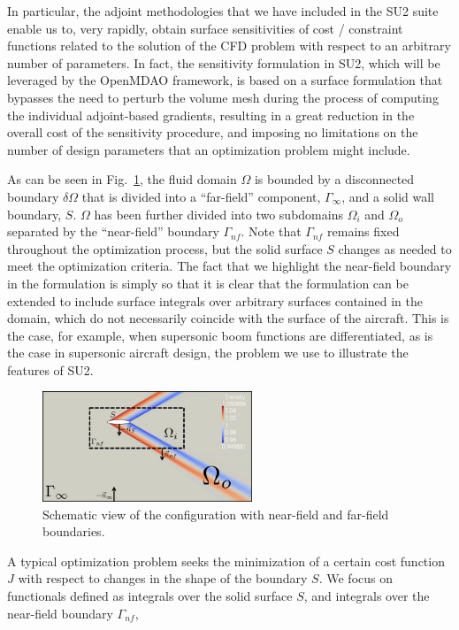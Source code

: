 \documentclass[]{aiaa-tc}
\begin{document}
In particular, the adjoint methodologies that we have included in the SU2 suite enable us to, very rapidly, obtain surface sensitivities of cost / constraint functions related to the solution of the CFD problem with respect to an arbitrary number of parameters.  In fact, the sensitivity formulation in SU2, which will be leveraged by the OpenMDAO framework, is based on a surface formulation that bypasses the need to perturb the volume mesh during the process of computing the individual adjoint-based gradients, resulting in a great reduction in the overall cost of the sensitivity procedure, and imposing no limitations on the number of design parameters that an optimization problem might include.

%
As can be seen in Fig.~\ref{fig:sketch}, the fluid domain $\Omega$ is bounded by a disconnected boundary $\delta \Omega$ that is divided into a ``far-field'' component, $\Gamma_\infty$, and a solid wall boundary, $S$. $\Omega$ has been further divided into two subdomains $\Omega_i$ and $\Omega_o$ separated by the ``near-field'' boundary $\Gamma_{nf}$. Note that $\Gamma_{nf}$ remains fixed throughout the optimization process, but the solid surface $S$ changes as needed to meet the optimization criteria.  The fact that we highlight the near-field boundary in the formulation is simply so that it is clear that the formulation can be extended to include surface integrals over arbitrary surfaces contained in the domain, which do not necessarily coincide with the surface of the aircraft.  This is the case, for example, when supersonic boom functions are differentiated, as is the case in supersonic aircraft design, the problem we use to illustrate the features of SU2.
%
\begin{figure}
  \begin{center}
	\includegraphics[bb = 0 0 720 378,width=0.56\textwidth]{images/sketch.jpg}
	\caption{Schematic view of the configuration with near-field and far-field boundaries.}\label{fig:sketch}
  \end{center}
\end{figure}
%
%
A typical optimization problem seeks the minimization of a certain cost function $J$ with respect to changes in the shape of the boundary $S$. We focus on functionals defined as integrals over the solid surface $S$, and integrals over the near-field boundary $\Gamma_{nf}$,
\end{document}
